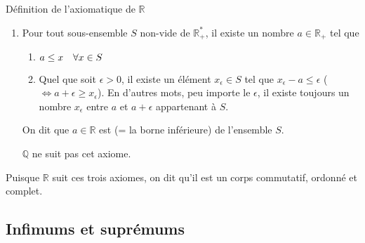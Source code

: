 \documentclass{article}
\begin{document}
\begin{parag}{Définition de l'axiomatique de $\mathbb{R}$}
\begin{enumerate}[left=0pt]
          Si $x \leq y$ et $x \neq y$, alors $x < y$. De la même manière, si $x \geq y$ et $x \neq y$, alors $x > y$.

         Cet axiome nous permet d'éliminer $\mathbb{C}$ de la définition. Cependant, $\mathbb{Q}$  est toujours là.

     \item {} Pour tout sous-ensemble $S$ non-vide de $\mathbb{R}^*_+$, il existe un nombre $a \in \mathbb{R}_+$ tel que
         \begin{enumerate}
             \item $a \leq x \quad \forall x \in S$
             \item Quel que soit $\epsilon > 0$, il existe un élément $x_{\epsilon} \in S$ tel que $x_{\epsilon} - a \leq \epsilon$ ($\iff a + \epsilon \geq x_{\epsilon}$). En d'autres mots, peu importe le $\epsilon$, il existe toujours un nombre $x_{\epsilon}$ entre $a$ et $a + \epsilon$ appartenant à $S$.
         \end{enumerate}

         On dit que $a \in \mathbb{R}$ est  (= la borne inférieure) de l'ensemble $S$.

         $\mathbb{Q}$ ne suit pas cet axiome.
   \end{enumerate}

   Puisque $\mathbb{R}$ suit ces trois axiomes, on dit qu'il est un corps commutatif, ordonné et complet.
\end{parag}

\subsection{Infimums et suprémums}
\end{document}
